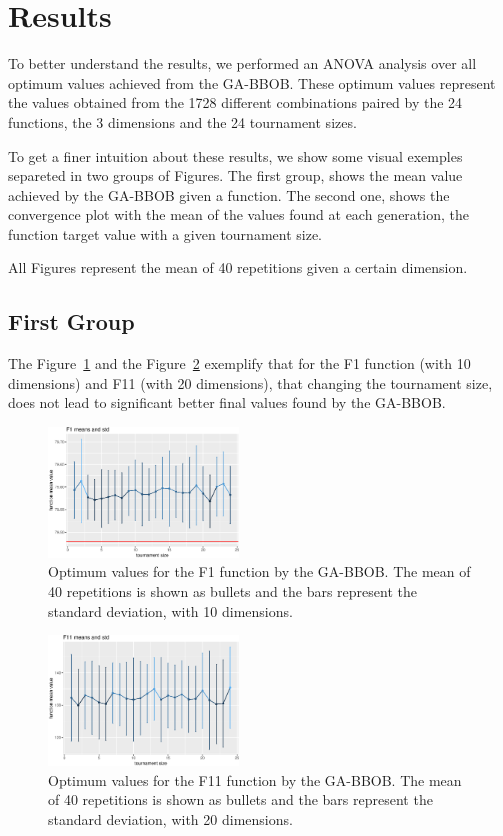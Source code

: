 \section{Results}\label{sec:results}

To better understand the results, we performed an ANOVA analysis over all optimum values achieved from the GA-BBOB. These optimum values represent the values obtained from the 1728 different combinations paired by the 24 functions, the 3 dimensions and the 24 tournament sizes.

To get a finer intuition about these results, we show  some visual exemples separeted in two groups of Figures. The first group, shows the mean value achieved by the GA-BBOB given a function. The second one, shows the convergence plot with the mean of the values found at each generation, the function target value with a given tournament size.

All Figures represent the mean of 40 repetitions given a certain dimension.

\subsection{First Group}
The Figure~\ref{tournsizeF1} and the Figure~\ref{tournsizeF11} exemplify that for the F1 function (with 10 dimensions) and F11 (with 20 dimensions), that changing the tournament size, does not lead to significant better final values found by the GA-BBOB.


\begin{figure}[!ht]
	\includegraphics[width=0.45\textwidth]{img/pressure-1}
	\caption{Optimum values for the F1 function by the GA-BBOB. The mean of 40 repetitions is shown as bullets and the bars represent the standard deviation, with 10 dimensions.}
	\label{tournsizeF1}
\end{figure}

\begin{figure}[!ht]
	\includegraphics[width=0.45\textwidth]{img/pressure-21}
	\caption{Optimum values for the F11 function by the GA-BBOB. The mean of 40 repetitions is shown as bullets and the bars represent the standard deviation, with 20 dimensions.}
	\label{tournsizeF11}
\end{figure}

